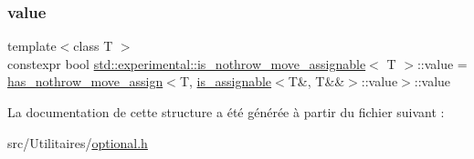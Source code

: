\subsubsection{\texorpdfstring{value}{value}}
{\footnotesize\ttfamily template$<$class T $>$ \\
constexpr bool \hyperlink{structstd_1_1experimental_1_1is__nothrow__move__assignable}{std\+::experimental\+::is\+\_\+nothrow\+\_\+move\+\_\+assignable}$<$ T $>$\+::value = \hyperlink{structstd_1_1experimental_1_1is__nothrow__move__assignable_1_1has__nothrow__move__assign}{has\+\_\+nothrow\+\_\+move\+\_\+assign}$<$T, \hyperlink{structstd_1_1experimental_1_1is__assignable}{is\+\_\+assignable}$<$T\&, T\&\&$>$\+::value$>$\+::value\hspace{0.3cm}{\ttfamily [static]}}



La documentation de cette structure a été générée à partir du fichier suivant \+:\begin{DoxyCompactItemize}
\item 
src/\+Utilitaires/\hyperlink{optional_8h}{optional.\+h}\end{DoxyCompactItemize}
